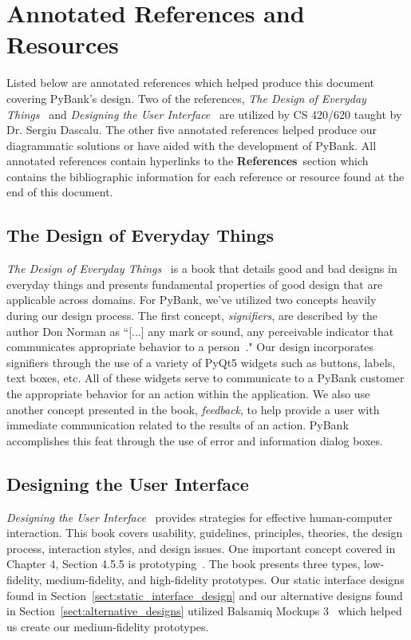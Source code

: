 \section{Annotated References and Resources}
\label{sect:annotated_references}

Listed below are annotated references which helped produce this document covering PyBank's design. Two of the references, \emph{The Design of Everyday Things}~\cite{THE_DESIGN_OF_EVERYDAY_THINGS:0} and \emph{Designing the User Interface}~\cite{DESIGNING_THE_USER_INTERFACE:6} are utilized by CS 420/620 taught by Dr. Sergiu Dascalu. The other five annotated references helped produce our diagrammatic solutions or have aided with the development of PyBank. All annotated references contain hyperlinks to the \textbf{References}~section which contains the bibliographic information for each reference or resource found at the end of this document.

\subsection{The Design of Everyday Things}
\label{sect:doet}

\emph{The Design of Everyday Things}~\cite{THE_DESIGN_OF_EVERYDAY_THINGS:0} is a book that details good and bad designs in everyday things and presents fundamental properties of good design that are applicable across domains. For PyBank, we've utilized two concepts heavily during our design process. The first concept, \emph{signifiers}, are described by the author Don Norman as ``[...] any mark or sound, any perceivable indicator that communicates appropriate behavior to a person~\cite{THE_DESIGN_OF_EVERYDAY_THINGS:0}." Our design incorporates signifiers through the use of a variety of PyQt5 widgets such as buttons, labels, text boxes, etc. All of these widgets serve to communicate to a PyBank customer the appropriate behavior for an action within the application. We also use another concept presented in the book, \emph{feedback}, to help provide a user with immediate communication related to the results of an action. PyBank accomplishes this feat through the use of error and information dialog boxes.

\subsection{Designing the User Interface}
\label{sect:dtui}

\emph{Designing the User Interface}~\cite{DESIGNING_THE_USER_INTERFACE:6} provides strategies for effective human-computer interaction. This book covers usability, guidelines, principles, theories, the design process, interaction styles, and design issues. One important concept covered in Chapter 4, Section 4.5.5 is prototyping~\cite{DESIGNING_THE_USER_INTERFACE:6}. The book presents three types, low-fidelity, medium-fidelity, and high-fidelity prototypes. Our static interface designs found in Section~\ref{sect:static_interface_design} and our alternative designs found in Section~\ref{sect:alternative_designs} utilized Balsamiq Mockups 3~\cite{BALSAMIQ_MOCKUPS_3:1} which helped us create our medium-fidelity prototypes.

